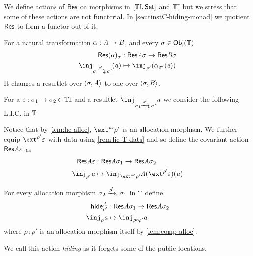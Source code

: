We define actions of $\mathsf{Res}\relax$ on morphisms in $[{\mathbb{T}\mathbb{I}}, \mathsf{Set}]$ and ${\mathbb{T}\mathbb{I}}$ but we stress that some of these actions are not functorial.
In \cref{sec:tinstC-hiding-monad} we quotient $\mathsf{Res}\relax$ to form a functor out of it.

\begin{definition}
    For a natural transformation $\alpha : \mathit{A} \to \mathit{B}$, and every $\sigma \in \mathsf{Obj}({\mathbb{T}})$
    \begin{align*}
        \typeRes(\alpha)_\sigma & : \typeRes\vA\sigma \to \typeRes\vB\sigma \\
        \inj_{\sigma \xato{\rho'} \sigma'}(\va) & \mapsto \inj_{\rho'}(\alpha_{\sigma'}(\va)) 
    \end{align*}
    It changes a resultlet over $\langle\sigma, \mathit{A}\rangle$ to one over $\langle\sigma, \mathit{B}\rangle$.
\end{definition}

\begin{definition}
For a $\varepsilon : \sigma_1 \to \sigma_2 \in {\mathbb{T}\mathbb{I}}$ and a resultlet $\inj_{\sigma_1 \xato{\rho'} \sigma'} \va$
we consider the following L.I.C. in $\mathbb{T}$
\begin{center}
\end{center}
Notice that by \cref{lem:lic-alloc}, $\ext^{\tinstU\me}\rho'$ is an allocation morphism.
We further equip $\ext^{\rho'}\me$ with data using \cref{rem:lic-T-data} and so define the covariant action $\mathsf{Res}\mathit{A}\varepsilon$ as
\begin{align*}
    \typeRes\vA\me & : \typeRes\vA{\sigma_1} \to \typeRes\vA{\sigma_2} \\
    \inj_{\rho'}\va & \mapsto \inj_{\ext^{\tinstU\me}{\rho'}} \vA(\ext^{\rho'}\me)(\va)
\end{align*}
\end{definition}

\begin{definition}
    For every allocation morphism $\sigma_2 \xato{\rho'} \sigma_1$ in $\mathbb{T}$ define
\begin{align*}
    \hideRes\vA{\rho'} & : \typeRes\vA\sigma_1 \to \typeRes\vA\sigma_2 \\ 
    \inj_\rho \va & \mapsto \inj_{\rho \comp \rho'} \va
\end{align*}
where $\rho \comp \rho'$ is an allocation morphism itself by \cref{lem:comp-alloc}.

We call this action \emph{hiding} as it forgets some of the public locations.
\end{definition}

